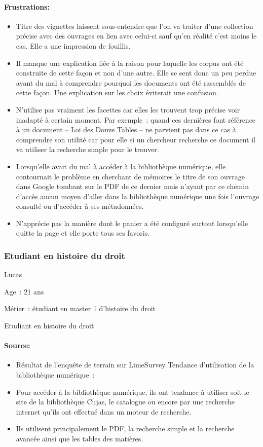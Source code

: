 \paragraph*{Frustrations:}
\begin{itemize}
	\item Titre des vignettes laissent sous-entendre que l’on va traiter d’une collection précise avec des ouvrages en lien avec celui-ci sauf qu’en réalité c’est moins le cas. Elle a une impression de fouillis.
\item Il manque une explication liée à la raison pour laquelle les corpus ont été construite de cette façon et non d’une autre. Elle se sent donc un peu perdue ayant du mal à comprendre pourquoi les documents ont été rassemblés de cette façon. Une explication sur les choix éviterait une confusion.
\item N’utilise pas vraiment les facettes car elles les trouvent trop précise voir inadapté à certain moment. Par exemple : quand ces dernières font référence à un document – Loi des Douze Tables – ne parvient pas dans ce cas à comprendre son utilité car pour elle si un chercheur recherche ce document il va utiliser la recherche simple pour le trouver.
\item Lorsqu’elle avait du mal à accéder à la bibliothèque numérique, elle contournait le problème en cherchant de mémoires le titre de son ouvrage dans Google tombant sur le PDF de ce dernier mais n’ayant par ce chemin d’accès aucun moyen d’aller dans la bibliothèque numérique une fois l’ouvrage consulté ou d’accéder à ses métadonnées. 
\item N’apprécie pas la manière dont le panier a été configuré surtout lorsqu’elle quitte la page et elle porte tous ses favoris. 
\end{itemize}


\subsubsection*{Etudiant en histoire du droit}
Lucas

Age : 21 ans
 
Métier : étudiant en master 1 d’histoire du droit

Etudiant en histoire du droit

\paragraph*{Source:}
\begin{itemize}
	\item Résultat de l’enquête de terrain sur LimeSurvey
Tendance d’utilisation de la bibliothèque numérique :
\item Pour accéder à la bibliothèque numérique, ils ont tendance à utiliser soit le site de la bibliothèque Cujas, le catalogue ou encore par une recherche internet qu’ils ont effectué dans un moteur de recherche.
\item Ils utilisent principalement le PDF, la recherche simple et la recherche avancée ainsi que les tables des matières.
\end{itemize}
